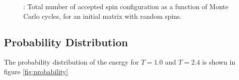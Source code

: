 \documentclass{article}
\begin{document}
{{		\begin{figure}[H]
		\caption{: Total number of accepted spin configuration as a function of Monte Carlo cycles, for an initial matrix with random spins. }
		\label{fig:flips_random}
		\end{figure}
\newpage
	\subsection{Probability Distribution}
		The probability distribution of the energy for $T = 1.0$ and $T = 2.4$ is shown in figure \ref{fig:probability}

}}
\end{document}

